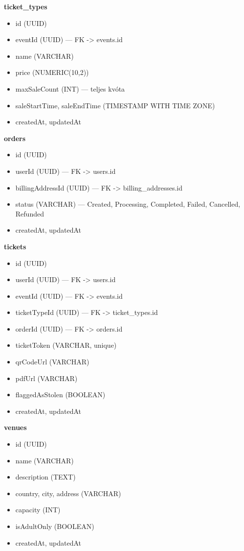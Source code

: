 \documentclass[colorlinks]{docs}
\theoremstyle{definition}
\theoremstyle{remark}
\begin{document}
\textbf{ticket\_types}
\begin{itemize}
    \item id (UUID)
    \item eventId (UUID) — FK -> events.id
    \item name (VARCHAR)
    \item price (NUMERIC(10,2))
    \item maxSaleCount (INT) — teljes kvóta
    \item saleStartTime, saleEndTime (TIMESTAMP WITH TIME ZONE)
    \item createdAt, updatedAt
\end{itemize}

\textbf{orders}
\begin{itemize}
    \item id (UUID)
    \item userId (UUID) — FK -> users.id
    \item billingAddressId (UUID) — FK -> billing\_addresses.id
    \item status (VARCHAR) — Created, Processing, Completed, Failed, Cancelled, Refunded
    \item createdAt, updatedAt
\end{itemize}

\textbf{tickets}
\begin{itemize}
    \item id (UUID)
    \item userId (UUID) — FK -> users.id
    \item eventId (UUID) — FK -> events.id
    \item ticketTypeId (UUID) — FK -> ticket\_types.id
    \item orderId (UUID) — FK -> orders.id
    \item ticketToken (VARCHAR, unique)
    \item qrCodeUrl (VARCHAR)
    \item pdfUrl (VARCHAR)
    \item flaggedAsStolen (BOOLEAN)
    \item createdAt, updatedAt
\end{itemize}

\textbf{venues}
\begin{itemize}
    \item id (UUID)
    \item name (VARCHAR)
    \item description (TEXT)
    \item country, city, address (VARCHAR)
    \item capacity (INT)
    \item isAdultOnly (BOOLEAN)
    \item createdAt, updatedAt
\end{itemize}
\end{document}
